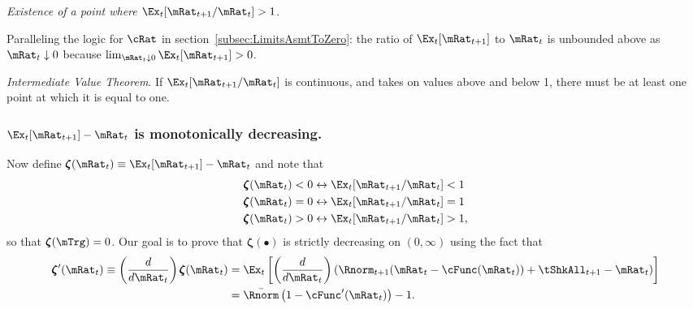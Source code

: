 \documentclass[\econtexRoot/BufferStockTheory]{subfiles}
\begin{document}
\medskip\medskip

\noindent \textit{Existence of a point where $\Ex_t [{\mRat}_{t+1}/\mRat_t] > 1$}.

Paralleling the logic for $\cRat$ in section~\ref{subsec:LimitsAsmtToZero}: the ratio of $\Ex_{t}[\mRat_{t+1}]$ to $\mRat_{t}$ is unbounded above as $\mRat_{t} \downarrow 0$ because $\lim_{\mRat_{t}\downarrow 0} \Ex_{t}[\mRat_{t+1}] > 0$.

\medskip\medskip

\noindent \textit{Intermediate Value Theorem}.  If $\Ex_t [{\mRat}_{t+1}/\mRat_t]$ is continuous, and takes on values above and below 1, there must be at least one point at which it is equal to one.

\subsubsection{$\Ex_t [{\mRat}_{t+1}] -\mRat_t$ is monotonically decreasing.}

Now define \providecommand{\difFunc}{\pmb{\zeta}} $\difFunc(\mRat_t) \equiv 
\Ex_t[\mRat_{t+1}] - \mRat_t$ and note that
\begin{align}\label{eq:difRatioEquiv}
  \difFunc(\mRat_t) < 0 &\leftrightarrow \Ex_t[{\mRat}_{t+1}/\mRat_t] < 1 
                          \nonumber\\
  \difFunc(\mRat_t) = 0 &\leftrightarrow \Ex_t[{\mRat}_{t+1}/\mRat_t] = 1\\
  \difFunc(\mRat_t) > 0 &\leftrightarrow \Ex_t[{\mRat}_{t+1}/\mRat_t] > 
                          1,\nonumber
\end{align}
so that $\difFunc(\mTrg)=0$. Our goal is to prove that $\difFunc(\bullet)$ is strictly 
decreasing on $(0,\infty)$ using the fact that
\begin{align}
  \difFunc^{\prime}(\mRat_{t}) \equiv  \left( \frac{d}{d\mRat_{t}}\right) \difFunc(\mRat_t)  & = \Ex_{t}\left[
                                                                                               \left( \frac{d}{d\mRat_{t}}\right) \left( 
                                                                                               {\Rnorm}_{t+1}(\mRat_{t}-\cFunc(\mRat_{t}))+%
                                                                                               {\tShkAll}_{t+1} - {\mRat}_t\right) \right] \label{eq:difFuncDecreases} \\
                                                                                             & = \bar{\Rnorm}\left(1-\cFunc^{\prime}({\mRat}_t)\right) - 1.  \notag
\end{align}
\end{document}
